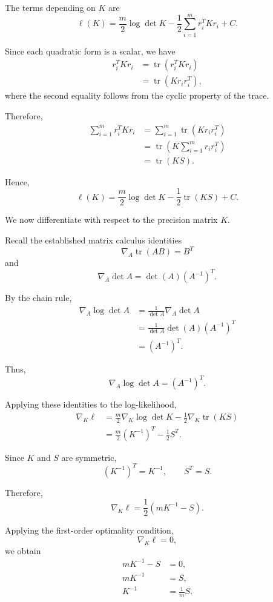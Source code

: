 \documentclass[10pt]{article}
\begin{document}
\begin{enumerate}
\begin{enumerate}[label=(\alph*)]
The terms depending on $K$ are
\[
\ell(K)
=
\frac{m}{2}\log\det K
-
\frac{1}{2}
\sum_{i=1}^{m}r_i^TKr_i
+C.
\]

Since each quadratic form is a scalar,
we have
\[
\begin{aligned}
r_i^TKr_i
&=
\operatorname{tr}(r_i^TKr_i)
\\[4pt]
&=
\operatorname{tr}(Kr_ir_i^T),
\end{aligned}
\]
where the second equality follows
from the cyclic property of the trace.

Therefore,
\[
\begin{aligned}
\sum_{i=1}^{m}r_i^TKr_i
&=
\sum_{i=1}^{m}
\operatorname{tr}(Kr_ir_i^T)
\\[4pt]
&=
\operatorname{tr}
\left(
K\sum_{i=1}^{m}r_ir_i^T
\right)
\\[4pt]
&=
\operatorname{tr}(KS).
\end{aligned}
\]

Hence,
\[
\boxed{
\ell(K)
=
\frac{m}{2}\log\det K
-
\frac{1}{2}\operatorname{tr}(KS)
+C.
}
\]

We now differentiate with respect to
the precision matrix $K$.

Recall the established matrix calculus identities
\[
\nabla_A\operatorname{tr}(AB)=B^T
\]
and
\[
\nabla_A\det A
=
\det(A)(A^{-1})^T.
\]

By the chain rule,
\[
\begin{aligned}
\nabla_A\log\det A
&=
\frac{1}{\det A}
\nabla_A\det A
\\[4pt]
&=
\frac{1}{\det A}
\det(A)(A^{-1})^T
\\[4pt]
&=
(A^{-1})^T.
\end{aligned}
\]

Thus,
\[
\boxed{
\nabla_A\log\det A
=
(A^{-1})^T.
}
\]

Applying these identities to the log-likelihood,
\[
\begin{aligned}
\nabla_K\ell
&=
\frac{m}{2}
\nabla_K\log\det K
-
\frac{1}{2}
\nabla_K\operatorname{tr}(KS)
\\[6pt]
&=
\frac{m}{2}(K^{-1})^T
-
\frac{1}{2}S^T.
\end{aligned}
\]

Since $K$ and $S$ are symmetric,
\[
(K^{-1})^T=K^{-1},
\qquad
S^T=S.
\]

Therefore,
\[
\boxed{
\nabla_K\ell
=
\frac{1}{2}
\left(
mK^{-1}-S
\right).
}
\]

Applying the first-order optimality condition,
\[
\nabla_K\ell=0,
\]
we obtain
\[
\begin{aligned}
mK^{-1}-S
&=0,
\\[4pt]
mK^{-1}
&=S,
\\[4pt]
K^{-1}
&=\frac{1}{m}S.
\end{aligned}
\]


\end{enumerate}
\end{enumerate}
\end{document}
